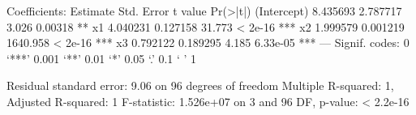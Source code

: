 Coefficients:
            Estimate Std. Error  t value Pr(>|t|)    
(Intercept) 8.435693   2.787717    3.026  0.00318 ** 
x1          4.040231   0.127158   31.773  < 2e-16 ***
x2          1.999579   0.001219 1640.958  < 2e-16 ***
x3          0.792122   0.189295    4.185 6.33e-05 ***
---
Signif. codes:  0 ‘***’ 0.001 ‘**’ 0.01 ‘*’ 0.05 ‘.’ 0.1 ‘ ’ 1

Residual standard error: 9.06 on 96 degrees of freedom
Multiple R-squared:      1,	Adjusted R-squared:      1 
F-statistic: 1.526e+07 on 3 and 96 DF,  p-value: < 2.2e-16

